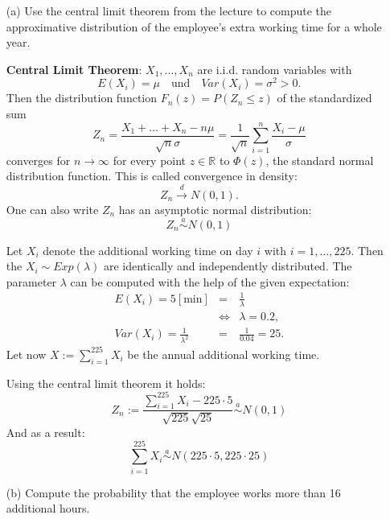 \documentclass[11pt]{article}
\newenvironment{loesung}{}{}          %
\begin{document}
\begin{enumerate}
\item[(a)] Use the central limit theorem from the lecture to compute the approximative distribution of the employee's extra working time for a whole year. 

\begin{loesung}\vspace{0.2cm}
\textbf{Central Limit Theorem}: $X_1,\ldots,X_n$ are i.i.d. random variables with 
    \[
 E(X_i) = \mu \quad \textrm{und} \quad Var(X_i)=\sigma^2 > 0.
\]
    Then the distribution function $F_n(z)=P(Z_n \leq z)$ of the standardized sum 
    \[
Z_n = \frac{X_1 + \ldots + X_n - n\mu}{\sqrt{n}\sigma}=\frac{1}{\sqrt{n}}\sum_{i=1}^n \frac{X_i-\mu}{\sigma}
    \]
    converges for $n \rightarrow \infty$ for every point $z \in \mathbb{R}$ to $\Phi(z)$, the standard normal distribution function. This is called convergence in density: 
    \[
Z_n \xrightarrow{d} N(0,1).
    \]
One can also write $Z_n$ has an asymptotic normal distribution:
    \[
Z_n \stackrel{a}{\sim} N(0,1)
    \]
    
Let $X_i$ denote the additional working time on day $i$ with $i=1,\ldots,225$. Then the $X_i\sim Exp(\lambda)$ are identically and independently distributed. The parameter $\lambda$ can be computed with the help of the given expectation:
\begin{eqnarray*}
E(X_i) = 5 [\text{min}] & = & \frac{1}{\lambda} \\
                 & \Leftrightarrow & \lambda = 0.2, \\
                 Var(X_i) = \frac{1}{\lambda^2} & = & \frac{1}{0.04} = 25.
\end{eqnarray*}
    Let now $X := \sum_{i=1}^{225}X_i$ be the annual additional working time.
    
Using the central limit theorem it holds:
    \[
Z_n  := \frac{\sum_{i=1}^{225} X_i - 225 \cdot 5 }{\sqrt{225} \sqrt{25}} \stackrel{a}{\sim} N (0, 1)
    \]
    And as a result:
    \[
    \sum_{i=1}^{225} X_i \stackrel{a}{\sim} N (225 \cdot 5, 225 \cdot 25)
    \]    
    

\end{loesung}



\item[(b)] Compute the probability that the employee works more than 16 additional hours.




\end{enumerate}
\end{document}

